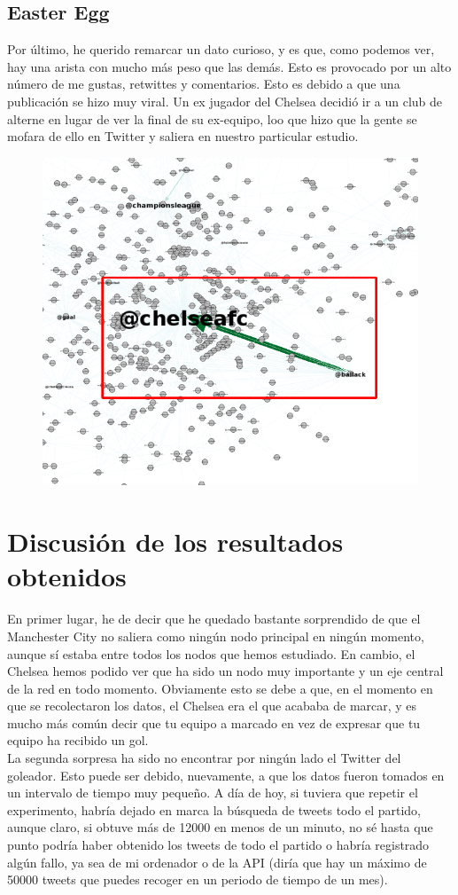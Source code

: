 \subsection{Easter Egg}
Por último, he querido remarcar un dato curioso, y es que, como podemos ver, hay una arista con mucho más peso que las demás. Esto es provocado por un alto número de me gustas, retwittes y comentarios. Esto es debido a que una publicación se hizo muy viral. Un ex jugador del Chelsea decidió ir a un club de alterne en lugar de ver la final de su ex-equipo, loo que hizo que la gente se mofara de ello en Twitter y saliera en nuestro particular estudio.
\begin{figure}[H]
	\centering
	\includegraphics[width=0.7\linewidth]{Imagenes/screenshot022}
\end{figure}

\newpage
\section{Discusión de los resultados obtenidos}
En primer lugar, he de decir que he quedado bastante sorprendido de que el Manchester City no saliera como ningún nodo principal en ningún momento, aunque sí estaba entre todos los nodos que hemos estudiado. En cambio, el Chelsea hemos podido ver que ha sido un nodo muy importante y un eje central de la red en todo momento. Obviamente esto se debe a que, en el momento en que se recolectaron los datos, el Chelsea era el que acababa de marcar, y es mucho más común decir que tu equipo a marcado en vez de expresar que tu equipo ha recibido un gol.\\

La segunda sorpresa ha sido no encontrar por ningún lado el Twitter del goleador. Esto puede ser debido, nuevamente, a que los datos fueron tomados en un intervalo de tiempo muy pequeño. A día de hoy, si tuviera que repetir el experimento, habría dejado en marca la búsqueda de tweets todo el partido, aunque claro, si obtuve más de 12000 en menos de un minuto, no sé hasta que punto podría haber obtenido los tweets de todo el partido o habría registrado algún fallo, ya sea de mi ordenador o de la API (diría que hay un máximo de 50000 tweets que puedes recoger en un periodo de tiempo de un mes).\\

